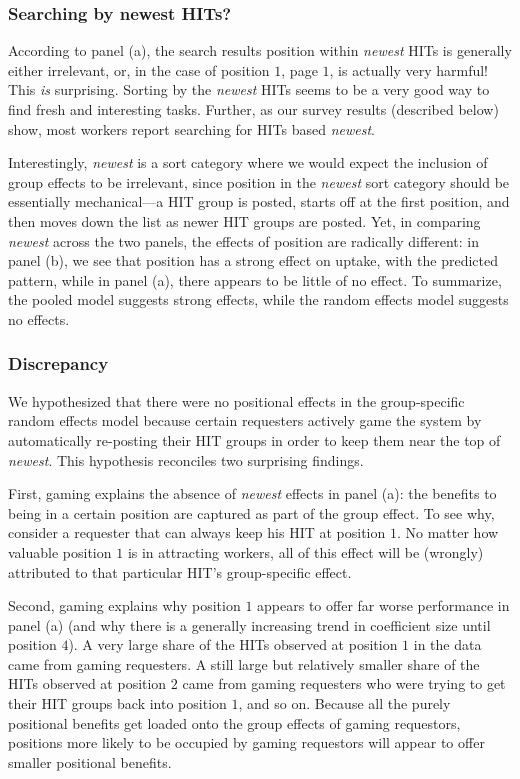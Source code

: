 \documentclass{sig-alternate}
\begin{document}
\subsubsection{Searching by newest HITs?}
According to panel (a), the search results position within {\em newest} HITs is
generally either irrelevant, or, in the case of position $1$, page $1$, is
actually very harmful!  This {\em is} surprising.  Sorting by the {\em
  newest} HITs seems to be a very good way to find fresh and
interesting tasks. Further, as our survey results (described below) show,
most workers report searching for HITs based {\em newest}.

Interestingly, {\em newest} is a sort category where we would expect
the inclusion of group effects to be irrelevant, since position in the
{\em newest} sort category should be essentially mechanical---a HIT
group is posted, starts off at the first position, and then moves down
the list as newer HIT groups are posted.  Yet, in comparing {\em
  newest} across the two panels, the effects of position are radically
different: in panel (b), we see that position has a strong effect on
uptake, with the predicted pattern, while in panel (a), there appears
to be little of no effect. To summarize, the pooled model suggests
strong effects, while the random effects model suggests no effects.

\subsubsection{Discrepancy}
We hypothesized that there were no positional effects in the group-specific
random effects model because certain requesters actively game the
system by automatically re-posting their HIT groups in order to keep them near
the top of {\em newest}.  This hypothesis reconciles two
surprising findings.

First, gaming explains the absence of {\em newest}
effects in panel (a): the benefits to being in a certain position are
captured as part of the group effect.  To see why, consider a requester
that can always keep his HIT at position $1$.  No matter how valuable
position $1$ is in attracting workers, all of this effect will be
(wrongly) attributed to that particular HIT's group-specific effect.

Second, gaming explains why position $1$ appears to offer far worse
performance in panel (a) (and why there is a generally increasing trend
in coefficient size until position $4$).  A very large share of the HITs
observed at position $1$ in the data came from gaming
requesters.  A still large but relatively smaller share of the HITs observed at
position $2$ came from gaming requesters who were trying to get their HIT groups back into position $1$, and so on.  Because
all the purely positional benefits get loaded onto the group effects
of gaming requestors, positions more likely to be occupied by gaming
requestors will appear to offer smaller positional benefits. 
\end{document}
